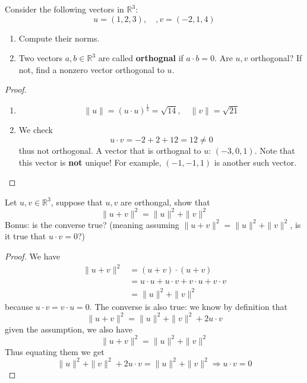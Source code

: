 \documentclass[openany]{book}
\newcommand{\R}{\mathbb{R}}
\begin{document}
\begin{prob}
    Consider the following vectors in $\R^3$:
    \begin{equation*}
        u=(1,2,3), \quad, v=(-2, 1, 4)
    \end{equation*}
    \begin{enumerate}
        \item Compute their norms.
        \item  Two vectors $a,b\in\R^3$ are called \textbf{orthognal} if $a\cdot b=0$. Are $u,v$ orthogonal? If not, find a nonzero vector orthogonal to $u$.
    \end{enumerate}
\end{prob}
\begin{proof}
    \begin{enumerate}
        \item \begin{equation*}
            \|u\|=(u\cdot u)^\frac{1}{2}=\sqrt{14}, \quad \|v\|=\sqrt{21}
        \end{equation*}
        \item We check 
        \begin{equation*}
            u\cdot v=-2+2+12=12\neq 0
        \end{equation*}
        thus not orthogonal. A vector that is orthognal to $u$: $(-3,0,1)$. Note that this vector is \textbf{not} unique! For example, $(-1,-1,1)$ is another such vector.
    \end{enumerate}
\end{proof}





\begin{prob}
    Let $u,v\in\R^3$, suppose that $u,v$ are orthongal, show that 
    \begin{equation*}
        \|u+v\|^2=\|u\|^2+\|v\|^2
    \end{equation*}
    Bonus: is the converse true? (meaning assuming $ \|u+v\|^2=\|u\|^2+\|v\|^2$, is it true that $u\cdot v=0$?)
\end{prob}
\begin{proof}
    We have 
    \begin{align*}
        \|u+v\|^2&=(u+v)\cdot(u+v)\\
        &=u\cdot u+u\cdot v+v\cdot u+v\cdot v\\
        &=\|u\|^2+\|v\|^2
    \end{align*}
    because $u\cdot v=v\cdot u=0$. The converse is also true: we know by definition that
    \begin{equation*}
        \|u+v\|^2=\|u\|^2+\|v\|^2+2u\cdot v
    \end{equation*}
    given the assumption, we also have 
    \begin{equation*}
        \|u+v\|^2=\|u\|^2+\|v\|^2
    \end{equation*}
    Thus equating them we get 
    \begin{equation*}
        \|u\|^2+\|v\|^2+2u\cdot v=\|u\|^2+\|v\|^2\Rightarrow u\cdot v=0
    \end{equation*}
\end{proof}
\end{document}
